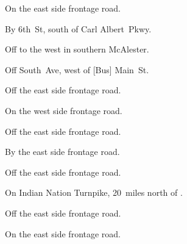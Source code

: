 
\begin{LocationList}

On the east side  frontage road.

By 6th~St, south of  Carl Albert~Pkwy.

Off  to the west in southern McAlester.

Off South~Ave, west of [Bus] Main~St.

\Location{\GarageHQ \Garage}
Off the east side  frontage road.

On the west side  frontage road.

Off the east side  frontage road.

By the east side  frontage road.

\Location{\TruckService \Service}
Off the east side  frontage road.

\Location{\TruckStop \Gas \Rest}
On  Indian Nation Turnpike, 20~miles north of .

Off the east side  frontage road.

On the east side  frontage road.

\end{LocationList}
